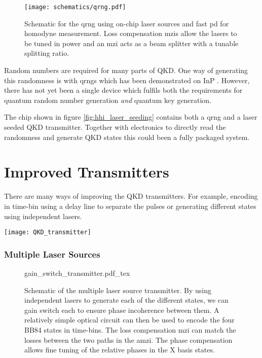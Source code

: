 \begin{figure}[t]
	\centering
	\texttt{[image: schematics/qrng.pdf]}
	\caption[Schematic for InP quantum random number generation]{Schematic for the \ac{qrng} using on-chip laser sources and fast \ac{pd} for homodyne measurement. Loss compensation \acp{mzi} allow the lasers to be tuned in power and an \ac{mzi} acts as a beam splitter with a tunable splitting ratio.}
\end{figure}

Random numbers are required for many parts of \ac{QKD}. One way of generating this randomness is with \acp{qrng} which has been demonstrated on \ac{InP} \cite{FrancescoThesis,Abellan2016}. However, there has not yet been a single device which fulfils both the requirements for quantum random number generation \textit{and} quantum key generation.

The chip shown in figure \ref{fig:hhi_laser_seeding} contains both a \ac{qrng} and a laser seeded \ac{QKD} transmitter. Together with electronics to directly read the randomness and generate \ac{QKD} states this could been a fully packaged system.

\section{Improved Transmitters}

There are many ways of improving the \ac{QKD} transmitters. For example, encoding in time-bin using a delay line to separate the pulses or generating different states using independent lasers.

\begin{sidewaysfigure}
	\centering
	\texttt{[image: QKD\_transmitter]}
	\caption[Latest generation InP QKD Transmitter]{Latest generation HHI indium phosphide transmitter. The \SI[product-units=power]{6x4}{mm} chip contains a few ways to create BB84 states for QKD. Firstly, we have designs to compare \ac{dfb} and \ac{DBR} lasers. Secondly, we can use a delay line to separate the time bins. Finally, we have multiplexed lasers to pulse independently lasers for each state.}
	\label{fig:hhi_gds}
\end{sidewaysfigure}

\subsubsection*{Multiple Laser Sources}

\begin{figure}[t]
	\centering
	\def\svgwidth{\textwidth}
	{gain_switch_transmitter.pdf_tex}
		\caption[Schematic of the multiple laser source transmitter]{Schematic of the multiple laser source transmitter. By using independent lasers to generate each of the different states, we can gain switch each to ensure phase incoherence between them. A relatively simple optical circuit can then be used to encode the four BB84 states in time-bins. The loss compensation \ac{mzi} can match the losses between the two paths in the \ac{amzi}. The phase compensation allows fine tuning of the relative phases in the X basis states.}
	\label{fig:multiple_lasers_tx}
\end{figure}

